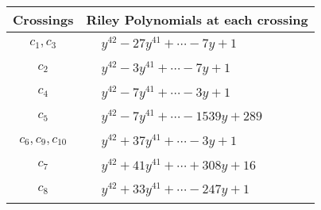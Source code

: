 \documentclass[1p]{elsarticle_modified}
\theoremstyle{definition}
\begin{document}
\begin{tabular}{m{50pt}|m{274pt}}
Crossings & \hspace{64pt}Riley Polynomials at each crossing \\
\hline $$\begin{aligned}c_{1},c_{3}\end{aligned}$$&$\begin{aligned}
&y^{42}-27 y^{41}+\cdots-7 y+1
\end{aligned}$\\
\hline $$\begin{aligned}c_{2}\end{aligned}$$&$\begin{aligned}
&y^{42}-3 y^{41}+\cdots-7 y+1
\end{aligned}$\\
\hline $$\begin{aligned}c_{4}\end{aligned}$$&$\begin{aligned}
&y^{42}-7 y^{41}+\cdots-3 y+1
\end{aligned}$\\
\hline $$\begin{aligned}c_{5}\end{aligned}$$&$\begin{aligned}
&y^{42}-7 y^{41}+\cdots-1539 y+289
\end{aligned}$\\
\hline $$\begin{aligned}c_{6},c_{9},c_{10}\end{aligned}$$&$\begin{aligned}
&y^{42}+37 y^{41}+\cdots-3 y+1
\end{aligned}$\\
\hline $$\begin{aligned}c_{7}\end{aligned}$$&$\begin{aligned}
&y^{42}+41 y^{41}+\cdots+308 y+16
\end{aligned}$\\
\hline $$\begin{aligned}c_{8}\end{aligned}$$&$\begin{aligned}
&y^{42}+33 y^{41}+\cdots-247 y+1
\end{aligned}$\\
\hline
\end{tabular}
\vskip 2pc
\end{document}
